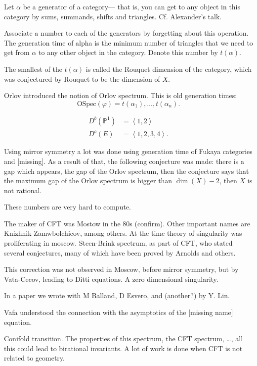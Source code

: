 Let $\alpha$ be a generator of a category---
that is, you can get to any object in this
category by sums, summands, shifts and
triangles. Cf. Alexander's talk.

Associate a number to each of the generators
by forgetting about this operation. The
generation time of alpha is the minimum
number of triangles that we need to get
from $\alpha$ to any other object
in the category. Denote this number by
$t(\alpha)$.

The smallest of the $t(\alpha)$ is called
the Rouquet dimension of the category,
which was conjectured by Rouquet
to be the dimension of $X$.

Orlov introduced the notion of Orlov
spectrum. This is old generation times:
$$
\text{OSpec}(\varphi)
= t(\alpha_1),…, t(\alpha_n).
$$

\begin{example}
\label{example-orlov-spectrum2}
$$
\begin{aligned}
D^b(\mathbb{P}^1)&=\left\langle{}1,2\right\rangle{}\\
D^b(E)&=\left\langle{}1,2,3,4\right\rangle{}.
\end{aligned}
$$
\end{example}

\noindent
Using mirror symmetry a lot was done
using generation time of Fukaya categories
and [missing]. As a result of that, the
following conjecture was made:
there is a gap which appears, the
gap of the Orlov spectrum, then the 
conjecture says that the maximum gap
of the Orlov spectrum is bigger than
$\dim (X) -2 $, then $X$ is not rational.

These numbers are very hard to compute.

The maker of CFT was Mostow in the 80s
(confirm). Other important names are
Knizhnik-Zamwbolchicov, among others.
At the time theory of singularity was
proliferating in moscow.
Steen-Brink spectrum, as part of CFT,
who stated several conjectures,
many of which have been proved by 
Arnolds and others.

This correction was not observed in Moscow,
before mirror symmetry, but by Vata-Cecov,
leading to Ditti equations.
A zero dimensional singularity.

In a paper we wrote with M Balland, D Esvero,
and (another?) by Y. Lin.

Vafa understood the connection with the
asymptotics of the [missing name] equation.

Conifold transition. The properties of this
spectrum, the CFT spectrum, …, all this
could lead to birational invariants.
A lot of work is done when CFT is
not related to geometry.

